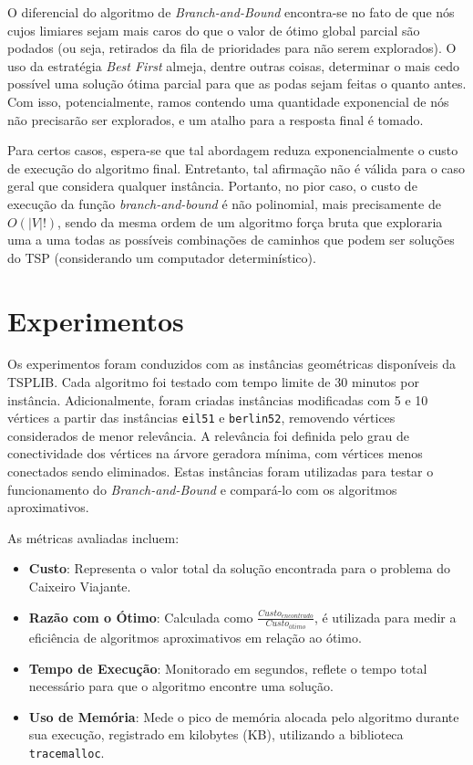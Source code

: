 \documentclass[12pt]{article}
\begin{document}
O diferencial do algoritmo de \textit{Branch-and-Bound} encontra-se no fato de que nós cujos limiares sejam mais caros do que o valor de ótimo global parcial são podados (ou seja, retirados da fila de prioridades para não serem explorados). O uso da estratégia \textit{Best First} almeja, dentre outras coisas, determinar o mais cedo possível uma solução ótima parcial para que as podas sejam feitas o quanto antes. Com isso, potencialmente, ramos contendo uma quantidade exponencial de nós não precisarão ser explorados, e um atalho para a resposta final é tomado.

Para certos casos, espera-se que tal abordagem reduza exponencialmente o custo de execução do algoritmo final. Entretanto, tal afirmação não é válida para o caso geral que considera qualquer instância. Portanto, no pior caso, o custo de execução da função \textit{branch-and-bound} é não polinomial, mais precisamente de $O(|V|!)$, sendo da mesma ordem de um algoritmo força bruta que exploraria uma a uma todas as possíveis combinações de caminhos que podem ser soluções do TSP (considerando um computador determinístico).

\section{Experimentos}

Os experimentos foram conduzidos com as instâncias geométricas disponíveis da TSPLIB. Cada algoritmo foi testado com tempo limite de 30 minutos por instância. Adicionalmente, foram criadas instâncias modificadas com 5 e 10 vértices a partir das instâncias \texttt{eil51} e \texttt{berlin52}, removendo vértices considerados de menor relevância. A relevância foi definida pelo grau de conectividade dos vértices na árvore geradora mínima, com vértices menos conectados sendo eliminados. Estas instâncias foram utilizadas para testar o funcionamento do \textit{Branch-and-Bound} e compará-lo com os algoritmos aproximativos.

As métricas avaliadas incluem:
\begin{itemize}
    \item \textbf{Custo}: Representa o valor total da solução encontrada para o problema do Caixeiro Viajante.
    \item \textbf{Razão com o Ótimo}: Calculada como $\frac{Custo_{encontrado}}{Custo_{ótimo}}$, é utilizada para medir a eficiência de algoritmos aproximativos em relação ao ótimo.
    \item \textbf{Tempo de Execução}: Monitorado em segundos, reflete o tempo total necessário para que o algoritmo encontre uma solução.
    \item \textbf{Uso de Memória}: Mede o pico de memória alocada pelo algoritmo durante sua execução, registrado em kilobytes (KB), utilizando a biblioteca \texttt{tracemalloc}.
\end{itemize}
\end{document}
